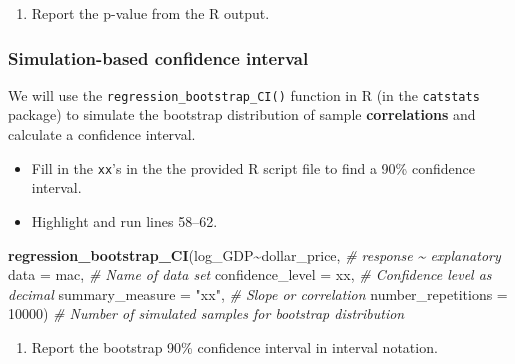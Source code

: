 \documentclass[
]{report}
\newenvironment{Shaded}{\begin{snugshade}}{\end{snugshade}}
\newcommand{\AttributeTok}[1]{\textcolor[rgb]{0.13,0.29,0.53}{#1}}
\newcommand{\CommentTok}[1]{\textcolor[rgb]{0.56,0.35,0.01}{\textit{#1}}}
\newcommand{\DecValTok}[1]{\textcolor[rgb]{0.00,0.00,0.81}{#1}}
\newcommand{\FunctionTok}[1]{\textcolor[rgb]{0.13,0.29,0.53}{\textbf{#1}}}
\newcommand{\NormalTok}[1]{#1}
\newcommand{\SpecialCharTok}[1]{\textcolor[rgb]{0.81,0.36,0.00}{\textbf{#1}}}
\newcommand{\StringTok}[1]{\textcolor[rgb]{0.31,0.60,0.02}{#1}}
\providecommand{\tightlist}{%
  \setlength{\itemsep}{0pt}\setlength{\parskip}{0pt}}
\begin{document}
\begin{enumerate}
\def\labelenumi{\arabic{enumi}.}
\setcounter{enumi}{9}
\tightlist
\item
  Report the p-value from the R output.
  \vspace{0.3in}
\end{enumerate}

\newpage

\subsubsection*{Simulation-based confidence interval}\label{simulation-based-confidence-interval-2}

We will use the \texttt{regression\_bootstrap\_CI()} function in R (in the \texttt{catstats} package) to simulate the bootstrap distribution of sample \textbf{correlations} and calculate a confidence interval.

\begin{itemize}
\item
  Fill in the \texttt{xx}'s in the the provided R script file to find a 90\% confidence interval.
\item
  Highlight and run lines 58--62.
\end{itemize}

\begin{Shaded}
\begin{Highlighting}[]
\FunctionTok{regression\_bootstrap\_CI}\NormalTok{(log\_GDP}\SpecialCharTok{\textasciitilde{}}\NormalTok{dollar\_price, }\CommentTok{\# response \textasciitilde{} explanatory}
   \AttributeTok{data =}\NormalTok{ mac, }\CommentTok{\# Name of data set}
   \AttributeTok{confidence\_level =}\NormalTok{ xx, }\CommentTok{\# Confidence level as decimal}
   \AttributeTok{summary\_measure =} \StringTok{"xx"}\NormalTok{, }\CommentTok{\# Slope or correlation}
   \AttributeTok{number\_repetitions =} \DecValTok{10000}\NormalTok{) }\CommentTok{\# Number of simulated samples for bootstrap distribution}
\end{Highlighting}
\end{Shaded}

\begin{enumerate}
\def\labelenumi{\arabic{enumi}.}
\setcounter{enumi}{10}
\tightlist
\item
  Report the bootstrap 90\% confidence interval in interval notation.\\
  \vspace{0.5in}
\end{enumerate}
\end{document}
